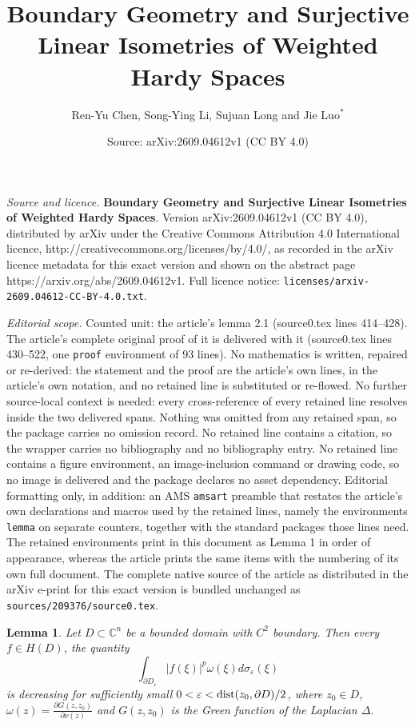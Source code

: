 \documentclass[10pt,a4paper]{amsart}
\title{\textbf{Boundary Geometry and Surjective Linear Isometries of Weighted Hardy Spaces}}
\author{Ren-Yu Chen, Song-Ying Li, Sujuan Long and Jie Luo$^{*}$}
\date{Source: arXiv:2609.04612v1 (CC BY 4.0)}
\newtheorem{lemma}{Lemma}
\begin{document}
\maketitle

\noindent\emph{Source and licence.} \textbf{Boundary Geometry and Surjective Linear Isometries of Weighted Hardy Spaces}. Version arXiv:2609.04612v1 (CC BY 4.0), distributed by arXiv under the Creative Commons Attribution 4.0 International licence, http://creativecommons.org/licenses/by/4.0/, as recorded in the arXiv licence metadata for this exact version and shown on the abstract page https://arxiv.org/abs/2609.04612v1. Full licence notice: \texttt{licenses/arxiv-2609.04612-CC-BY-4.0.txt}.\par\smallskip

\noindent\textit{Editorial scope.} Counted unit: the article's lemma 2.1 (source0.tex lines 414--428). The article's complete original proof of it is delivered with it (source0.tex lines 430--522, one \texttt{proof} environment of 93 lines). No mathematics is written, repaired or re-derived: the statement and the proof are the article's own lines, in the article's own notation, and no retained line is substituted or re-flowed.  No further source-local context is needed: every cross-reference of every retained line resolves inside the two delivered spans.  Nothing was omitted from any retained span, so the package carries no omission record.  No retained line contains a citation, so the wrapper carries no bibliography and no bibliography entry.  No retained line contains a figure environment, an image-inclusion command or drawing code, so no image is delivered and the package declares no asset dependency.  Editorial formatting only, in addition: an AMS \texttt{amsart} preamble that restates the article's own declarations and macros used by the retained lines, namely the environments \texttt{lemma} on separate counters, together with the standard packages those lines need.  The retained environments print in this document as Lemma 1 in order of appearance, whereas the article prints the same items with the numbering of its own full document.  The complete native source of the article as distributed in the arXiv e-print for this exact version is bundled unchanged as \texttt{sources/209376/source0.tex}.
\begin{lemma}
\label{2.1} Let $D\subset\mathbb{C}^{n}$ be a bounded domain with $C^{2}$
boundary. Then
every $f\in H(D)$, the quantity
\[
\int_{\partial D_{\varepsilon}}|f(\xi)|^{p}
\omega(\xi) d\sigma_{\varepsilon}(\xi)
\]
is decreasing for sufficiently small $0<\varepsilon<\hbox{dist}(z_{0},
\partial D)/2$, where $z_{0}\in D$, $\omega(z)={\frac{\partial G(z, z_{0}%
)}{\partial\nu(z)}}$ and $G(z, z_{0})$ is the Green function of the Laplacian
$\Delta$.
\end{lemma}
\end{document}
